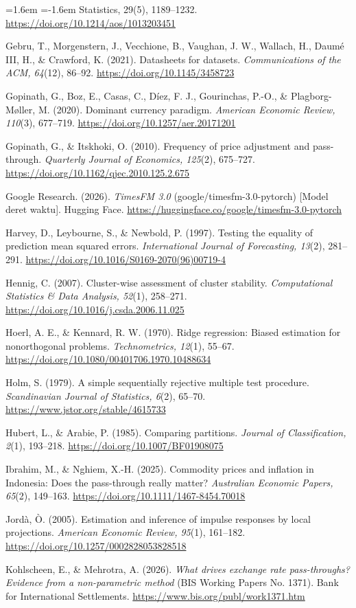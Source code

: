 \documentclass[11pt,a4paper]{article}
\newcommand{\refitem}[1]{\item\label{ref:#1}}
\begin{document}
\begin{list}{}{\leftmargin=1.6em \itemindent=-1.6em \itemsep=1.5pt \parsep=0pt \topsep=2pt}
{Statistics, 29}(5), 1189–1232. \url{https://doi.org/10.1214/aos/1013203451}
\refitem{gebru2021} Gebru, T., Morgenstern, J., Vecchione, B., Vaughan, J. W., Wallach, H., Daumé III, H., \& Crawford, K. (2021).
Datasheets for datasets. \textit{Communications of the ACM, 64}(12), 86–92. \url{https://doi.org/10.1145/3458723}
\refitem{gopinath2020} Gopinath, G., Boz, E., Casas, C., Díez, F. J., Gourinchas, P.-O., \& Plagborg-Møller, M. (2020). Dominant
currency paradigm. \textit{American Economic Review, 110}(3), 677–719. \url{https://doi.org/10.1257/aer.20171201}
\refitem{gopinath2010} Gopinath, G., \& Itskhoki, O. (2010). Frequency of price adjustment and pass-through. \textit{Quarterly Journal
of Economics, 125}(2), 675–727. \url{https://doi.org/10.1162/qjec.2010.125.2.675}
\refitem{google2026} Google Research. (2026). \textit{TimesFM 3.0} (google/timesfm-3.0-pytorch) [Model deret waktu]. Hugging Face.
\url{https://huggingface.co/google/timesfm-3.0-pytorch}
\refitem{hln1997} Harvey, D., Leybourne, S., \& Newbold, P. (1997). Testing the equality of prediction mean squared errors.
\textit{International Journal of Forecasting, 13}(2), 281–291. \url{https://doi.org/10.1016/S0169-2070(96)00719-4}
\refitem{hennig2007} Hennig, C. (2007). Cluster-wise assessment of cluster stability. \textit{Computational Statistics \& Data
Analysis, 52}(1), 258–271. \url{https://doi.org/10.1016/j.csda.2006.11.025}
\refitem{hoerl1970} Hoerl, A. E., \& Kennard, R. W. (1970). Ridge regression: Biased estimation for nonorthogonal problems.
\textit{Technometrics, 12}(1), 55–67. \url{https://doi.org/10.1080/00401706.1970.10488634}
\refitem{holm1979} Holm, S. (1979). A simple sequentially rejective multiple test procedure. \textit{Scandinavian Journal of
Statistics, 6}(2), 65–70. \url{https://www.jstor.org/stable/4615733}
\refitem{hubert1985} Hubert, L., \& Arabie, P. (1985). Comparing partitions. \textit{Journal of Classification, 2}(1), 193–218.
\url{https://doi.org/10.1007/BF01908075}
\refitem{ibrahim2025} Ibrahim, M., \& Nghiem, X.-H. (2025). Commodity prices and inflation in Indonesia: Does the pass-through really
matter? \textit{Australian Economic Papers, 65}(2), 149–163. \url{https://doi.org/10.1111/1467-8454.70018}
\refitem{jorda2005} Jordà, Ò. (2005). Estimation and inference of impulse responses by local projections. \textit{American Economic
Review, 95}(1), 161–182. \url{https://doi.org/10.1257/0002828053828518}
\refitem{kohlscheen2026} Kohlscheen, E., \& Mehrotra, A. (2026). \textit{What drives exchange rate pass-throughs? Evidence from a
non-parametric method} (BIS Working Papers No. 1371). Bank for International Settlements. \url{https://www.bis.org/publ/work1371.htm}

\end{list}
\end{document}
